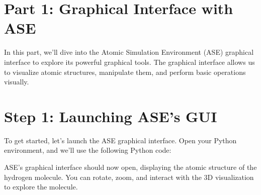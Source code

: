 \documentclass[letterpaper,10pt,english]{sphinxmanual}
\begin{document}
\section{Part 1: Graphical Interface with ASE}
\label{\detokenize{asebasics/asebasics:part-1-graphical-interface-with-ase}}
\sphinxAtStartPar
In this part, we’ll dive into the Atomic Simulation Environment (ASE) graphical interface to explore its powerful graphical tools. The graphical interface allows us to visualize atomic structures, manipulate them, and perform basic operations visually.


\section{Step 1: Launching ASE’s GUI}
\label{\detokenize{asebasics/asebasics:step-1-launching-ase-s-gui}}
\sphinxAtStartPar
To get started, let’s launch the ASE graphical interface. Open your Python environment, and we’ll use the following Python code:

\begin{sphinxVerbatim}[commandchars=\\\{\}]
   

   
   \PYG{p}{[}\PYG{p}{[}  \PYG{p}{]} \PYG{p}{[}  \PYG{p}{]}\PYG{p}{]}

\end{sphinxVerbatim}

\sphinxAtStartPar
ASE’s graphical interface should now open, displaying the atomic structure of the hydrogen molecule. You can rotate, zoom, and interact with the 3D visualization to explore the molecule.
\end{document}
